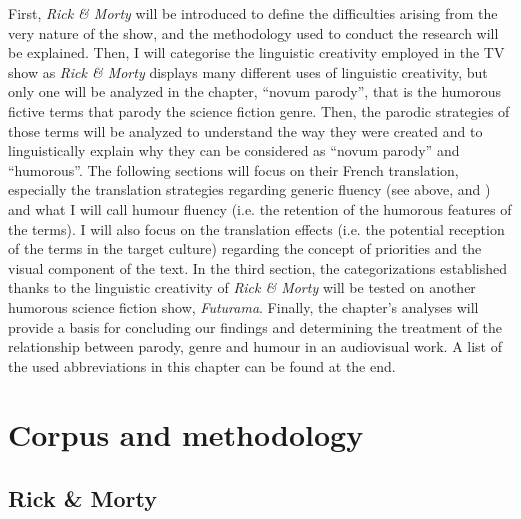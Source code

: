 \documentclass[output=paper]{langscibook}
\begin{document}
First, \textit{Rick \& Morty} will be introduced to define the difficulties arising from the very nature of the show, and the methodology used to conduct the research will be explained. Then, I will categorise the linguistic creativity employed in the TV show as \textit{Rick \& Morty} displays many different uses of linguistic creativity, but only one will be analyzed in the chapter, “novum parody”, that is the humorous fictive terms that parody the science fiction genre. Then, the parodic strategies of those terms will be analyzed to understand the way they were created and to linguistically explain why they can be considered as “novum parody” and “humorous”. The following sections will focus on their French translation, especially the translation strategies regarding generic fluency (see above, \citealt{Korpi2017} and \citealt{Korpi2021}) and what I will call humour fluency (i.e. the retention of the humorous features of the terms). I will also focus on the translation effects (i.e. the potential reception of the terms in the target culture) regarding the concept of priorities and the visual component of the text. In the third section, the categorizations established thanks to the linguistic creativity of \textit{Rick \& Morty} will be tested on another humorous science fiction show, \textit{Futurama}. Finally, the chapter’s analyses will provide a basis for concluding our findings and determining the treatment of the relationship between parody, genre and humour in an audiovisual work. A list of the used abbreviations in this chapter can be found at the end.

\section{Corpus and methodology}

\subsection{Rick \& Morty}
\end{document}
